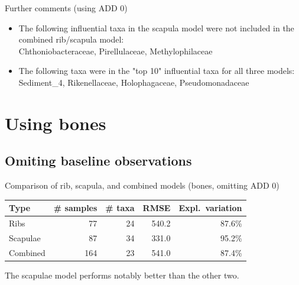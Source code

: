 \documentclass{beamer}
\begin{document}
\begin{frame}{Further comments (using ADD 0)}
  
  \begin{itemize}
    \item The following influential taxa in the scapula model were not included
    in the combined rib/scapula model:\\
    Chthoniobacteraceae, Pirellulaceae, Methylophilaceae
    \item The following taxa were in the "top 10" influential taxa for all
    three models:\\
    Sediment\_4, Rikenellaceae, Holophagaceae, Pseudomonadaceae
  \end{itemize}

\end{frame}





\section{Using bones}


\subsection{Omiting baseline observations}

\begin{frame}{Comparison of rib, scapula, and combined models (bones, omitting ADD 0)}

  \begin{tabular}{lrrrr}
    Type & \# samples & \# taxa & RMSE & Expl.\ variation\\ \hline
    Ribs & 77 & 24 & 540.2 & 87.6\% \\
    Scapulae & 87 & 34 & 331.0 & 95.2\% \\
    Combined & 164 & 23 & 541.0 & 87.4\%
  \end{tabular}

  \vspace{0.2in}

  \footnotesize{
    \noindent The scapulae model performs notably better than the other two.
    }

\end{frame}
\end{document}
